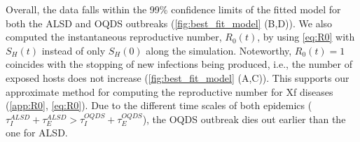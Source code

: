 \begin{table}[H]
    \centering
    \caption[Estimated parameters of the model for OQDS in Apulia]{Estimated
        epidemiological parameters from Bayesian model
        fitting to the disease progression curve of OQDS in Apulia.}
    \label{tab:parameter_estimates_OQDS}
\end{table}

Overall, the data falls within the 99\% confidence limits of the fitted
model for both the ALSD and OQDS outbreaks (\cref{fig:best_fit_model} (B,D)).
We
also computed the instantaneous reproductive number, $R_0(t)$, by using
\cref{eq:R0} with $S_H(t)$ instead of only $S_H(0)$ along the simulation.
Noteworthy, $R_0(t)=1$ coincides with the stopping of new infections being
produced, i.e., the number of exposed hosts does not increase
(\cref{fig:best_fit_model} (A,C)). This supports our approximate method for
computing the reproductive number for Xf diseases (\cref{app:R0},
\cref{eq:R0}). Due to the different time scales of both epidemics
($\tau_I^{ALSD}+\tau_E^{ALSD} > \tau_I^{OQDS}+\tau_E^{OQDS}$), the OQDS
outbreak dies out earlier than the one for ALSD.

